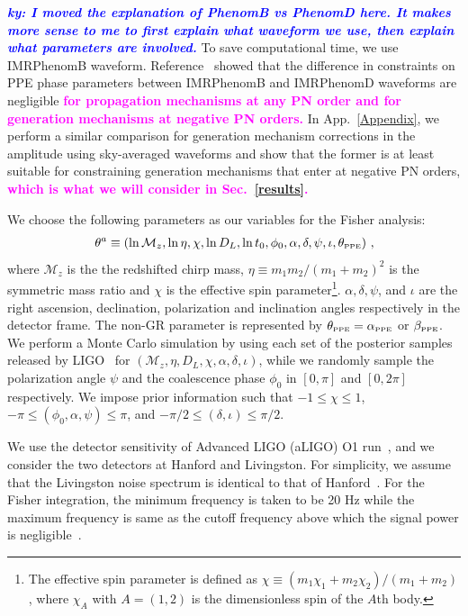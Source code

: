 \documentclass[prd,twocolumn,nofootinbib]{revtex4-1}
\newcommand\ba{\begin{eqnarray}}
\newcommand\ea{\end{eqnarray}}
\newcommand\bw{\begin{widetext}}
\newcommand\ew{\end{widetext}}
\newcommand{\lb}{\left(}
\newcommand{\rb}{\right)}
\newcommand{\PPE}{{\mbox{\tiny PPE}}}
\newcommand{\ky}[1]{\textcolor{blue}{\it{\textbf{ky: #1}}} }
\newcommand{\kent}[1]{\textcolor{magenta}{\textbf{#1}} }
\begin{document}
\ky{I moved the explanation of PhenomB vs PhenomD here. It makes more sense to me to first explain what waveform we use, then explain what parameters are involved.}
To save computational time, we use IMRPhenomB waveform. Reference~\cite{Yunes:2016jcc} showed that the difference in constraints on PPE phase parameters between IMRPhenomB and IMRPhenomD waveforms are negligible \kent{for propagation mechanisms at any PN order and for generation mechanisms at negative PN orders.}
In App.~\ref{Appendix}, we perform a similar comparison for generation mechanism corrections in the amplitude using sky-averaged waveforms and show that the former is at least suitable for constraining generation mechanisms that enter at negative PN orders, \kent{which is what we will consider in Sec.~\ref{results}.} 

We choose the following parameters as our variables for the Fisher analysis:
\ba\label{parameters}
\theta^a\equiv \lb \ln{\mathcal{M}_z}, \ln{\eta}, \chi, \ln{D_L}, \ln{t_0},  \phi_0,\alpha, \delta, \psi, \iota, \theta_\PPE \rb\,, \nonumber \\
\ea
where $\mathcal{M}_z$ is the the redshifted chirp mass, $\eta \equiv m_1m_2/(m_1+m_2)^2$ is the symmetric mass ratio and $\chi$ is the effective spin parameter\footnote{The effective spin parameter is defined as $\chi\equiv\lb m_1 \chi_1+m_2\chi_2\rb /\lb m_1+m_2\rb$, where $\chi_A$ with $A=(1,2)$ is the dimensionless spin of the $A$th body.}. $\alpha, \delta, \psi$, and  $\iota$ are the right ascension, declination, polarization and inclination angles respectively in the detector frame. The non-GR parameter is represented by $\theta_\PPE=\alpha_{\PPE}$ or $\beta_{\PPE}$.
We perform a Monte Carlo simulation by using each set of the posterior samples released by LIGO~\cite{ligo:sample} for $(\mathcal{M}_z, \eta, D_L, \chi, \alpha, \delta, \iota)$, while we randomly sample the polarization angle $\psi$ and the coalescence phase $\phi_0$ in $[0,\pi]$ and $[0,2\pi]$ respectively.
We impose prior information such that $-1 \leq \chi \leq 1$, $-\pi \leq (\phi_0, \alpha, \psi) \leq \pi$, and $-\pi/2 \leq ( \delta, \iota) \leq \pi/2$.

We use the detector sensitivity of Advanced LIGO (aLIGO) O1 run~\cite{LIGOScientific:2018mvr}, and we consider the two detectors at Hanford and Livingston. For simplicity, we assume that the Livingston noise spectrum is identical to that of  Hanford~\cite{Yunes:2009yz}. For the Fisher integration, the minimum frequency is taken to be 20 Hz while the maximum frequency is same as the cutoff frequency above which the signal power is negligible~\cite{Ajith:2009bn}.
\end{document}
